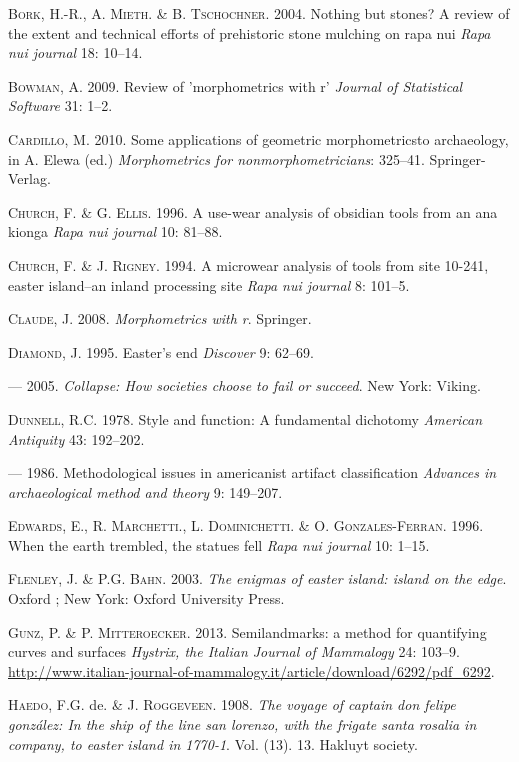 \documentclass[]{article}
\begin{document}
\textsc{Bork}, H.-R., A. \textsc{Mieth}. \& B. \textsc{Tschochner}.
2004. Nothing but stones? A review of the extent and technical efforts
of prehistoric stone mulching on rapa nui \emph{Rapa nui journal} 18:
10--14.

\textsc{Bowman}, A. 2009. Review of 'morphometrics with r' \emph{Journal
of Statistical Software} 31: 1--2.

\textsc{Cardillo}, M. 2010. Some applications of geometric
morphometricsto archaeology, in A. Elewa (ed.) \emph{Morphometrics for
nonmorphometricians}: 325--41. Springer-Verlag.

\textsc{Church}, F. \& G. \textsc{Ellis}. 1996. A use-wear analysis of
obsidian tools from an ana kionga \emph{Rapa nui journal} 10: 81--88.

\textsc{Church}, F. \& J. \textsc{Rigney}. 1994. A microwear analysis of
tools from site 10-241, easter island--an inland processing site
\emph{Rapa nui journal} 8: 101--5.

\textsc{Claude}, J. 2008. \emph{Morphometrics with r}. Springer.

\textsc{Diamond}, J. 1995. Easter's end \emph{Discover} 9: 62--69.

--- 2005. \emph{Collapse: How societies choose to fail or succeed}. New
York: Viking.

\textsc{Dunnell}, R.C. 1978. Style and function: A fundamental dichotomy
\emph{American Antiquity} 43: 192--202.

--- 1986. Methodological issues in americanist artifact classification
\emph{Advances in archaeological method and theory} 9: 149--207.

\textsc{Edwards}, E., R. \textsc{Marchetti}., L. \textsc{Dominichetti}.
\& O. \textsc{Gonzales-Ferran}. 1996. When the earth trembled, the
statues fell \emph{Rapa nui journal} 10: 1--15.

\textsc{Flenley}, J. \& P.G. \textsc{Bahn}. 2003. \emph{The enigmas of
easter island: island on the edge}. Oxford ; New York: Oxford University
Press.

\textsc{Gunz}, P. \& P. \textsc{Mitteroecker}. 2013. Semilandmarks: a
method for quantifying curves and surfaces \emph{Hystrix, the Italian
Journal of Mammalogy} 24: 103--9.
\url{http://www.italian-journal-of-mammalogy.it/article/download/6292/pdf_6292}.

\textsc{Haedo}, F.G. de. \& J. \textsc{Roggeveen}. 1908. \emph{The
voyage of captain don felipe gonzález: In the ship of the line san
lorenzo, with the frigate santa rosalia in company, to easter island in
1770-1}. Vol. (13). 13. Hakluyt society.
\end{document}
